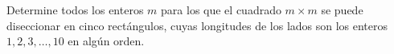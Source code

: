 Determine todos los enteros $m$ para los que el cuadrado $m \times m$ se puede diseccionar en cinco rectángulos, cuyas longitudes de los lados son los enteros $1,2,3,\ldots,10$ en algún orden.